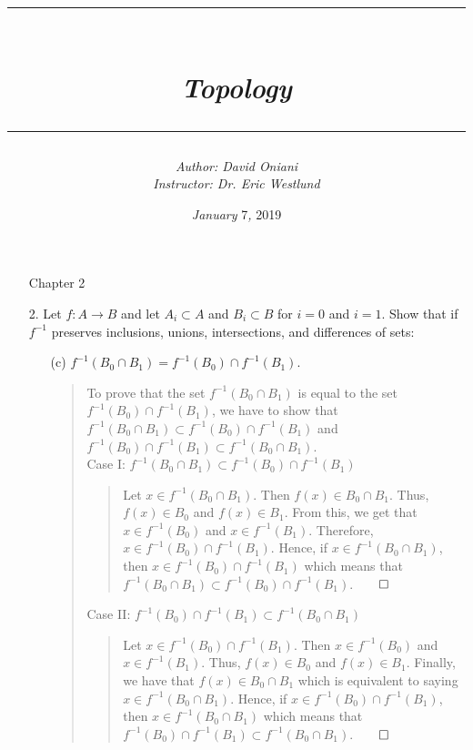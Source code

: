 \documentclass[12pt, a4paper]{article}
\title{\rule{\paperwidth - 150pt}{1pt}\textbf{\\\textit{Topology}\\}\rule{\paperwidth - 150pt}{1pt}}
\author
{
\textit{Author: David Oniani}
\\
\textit{Instructor: Dr. Eric Westlund}
}
\date{\textit{January }7\textit{, }2019}
\newcommand{\rarr}{\rightarrow}
\begin{document}
\maketitle


\begin{itemize}
\item[]
{\large Chapter 2}
\vspace{0.3cm}


\item[2.]
Let $f : A \rarr B$ and let $A_i \subset A$ and $B_i \subset B$
for $i = 0$ and $i = 1$. Show that if $f^{-1}$ preserves inclusions,
unions, intersections, and differences of sets:

\begin{itemize}
\item[(c)]
$f^{-1}(B_0 \cap B_1) = f^{-1}(B_0) \cap f^{-1}(B_1)$.
\vspace{0.25cm}

\begin{quote}
To prove that the set $f^{-1}(B_0 \cap B_1)$
is equal to the set $f^{-1}(B_0) \cap f^{-1}(B_1)$,
we have to show that $f^{-1}(B_0 \cap B_1) \subset f^{-1}(B_0) \cap f^{-1}(B_1)$
and $f^{-1}(B_0) \cap f^{-1}(B_1) \subset f^{-1}(B_0 \cap B_1)$.
\\
\vspace{0.5cm}
Case I: $f^{-1}(B_0 \cap B_1) \subset f^{-1}(B_0) \cap f^{-1}(B_1)$\\
\vspace{0.15cm}

\begin{quote}
Let $x \in f^{-1}(B_0 \cap B_1)$. Then $f(x) \in B_0 \cap B_1$. Thus, $f(x) \in B_0$
and $f(x) \in B_1$. From this, we get that $x \in f^{-1}(B_0)$ and $x \in f^{-1}(B_1)$.
Therefore, $x \in f^{-1}(B_0) \cap f^{-1}(B_1)$. Hence, if $x \in f^{-1}(B_0 \cap B_1)$,
then $x \in f^{-1}(B_0) \cap f^{-1}(B_1)$ which means that $f^{-1}(B_0 \cap B_1) \subset f^{-1}(B_0) \cap f^{-1}(B_1)$.$\qed$
\end{quote}

\vspace{0.5cm}
Case II: $f^{-1}(B_0) \cap f^{-1}(B_1) \subset f^{-1}(B_0 \cap B_1)$\\
\vspace{0.15cm}

\begin{quote}
Let $x \in f^{-1}(B_0) \cap f^{-1}(B_1)$. Then $x \in f^{-1}(B_0)$ and $x \in f^{-1}(B_1)$.
Thus, $f(x) \in B_0$ and $f(x) \in B_1$. Finally, we have that $f(x) \in B_0 \cap B_1$ which
is equivalent to saying $x \in f^{-1}(B_0 \cap B_1)$. Hence, if $x \in f^{-1}(B_0) \cap f^{-1}(B_1)$,
then $x \in f^{-1}(B_0 \cap B_1)$ which means that $f^{-1}(B_0) \cap f^{-1}(B_1) \subset f^{-1}(B_0 \cap B_1)$.$\qed$
\end{quote}
\vspace{0.5cm}


\end{quote}
\end{itemize}
\end{itemize}
\end{document}
